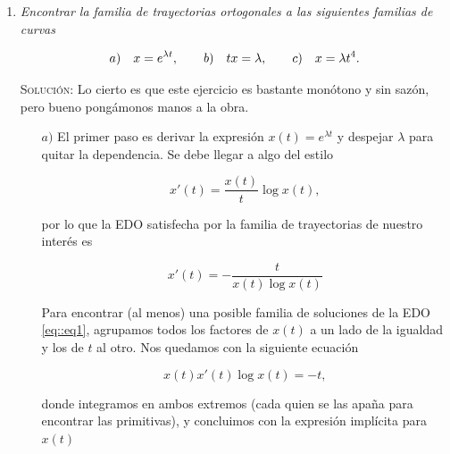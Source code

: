 \documentclass{article}
\begin{document}
\begin{enumerate}
\begin{itemize}
        Con esta sucesión de pasos de inferencia y el resultado del apartado anterior llegamos a la siguiente EDO autónoma, aunque no en forma normal\footnote{Confío en la ausencia de erratas a lo largo del ejercicio, corroborar las cuentas requiere demasiado esfuerzo.}:

        \[x'(t)^2 = 2 \cdot \left[\left(\frac{\sqrt{5}}{2x(t)+1}\right)^2 - 1\right].\]

        $\hfill\square$

        \newpage
    \end{itemize}

    \item \textit{Encontrar la familia de trayectorias ortogonales a las siguientes familias de curvas}

    \[a) \hspace{10px} x = e^{\lambda t}, \hspace{20px} b) \hspace{10px} t x = \lambda, \hspace{20px} c) \hspace{10px} x = \lambda t^4.\]

    \vspace{7px}

    \textsc{Solución:} Lo cierto es que este ejercicio es bastante monótono y sin sazón, pero bueno pongámonos manos a la obra.

    \begin{itemize}
        \item[$a)$] El primer paso es derivar la expresión $x(t) = e^{\lambda t}$ y despejar $\lambda$ para quitar la dependencia. Se debe llegar a algo del estilo
        
        \[x'(t) = \frac{x(t)}{t}\log x(t),\]

        por lo que la EDO satisfecha por la familia de trayectorias de nuestro interés es

        \begin{equation}
            x'(t) = -\frac{t}{x(t) \log x(t)}
            \label{eq::eq1}
        \end{equation}

        Para encontrar (al menos) una posible familia de soluciones de la EDO \eqref{eq::eq1}, agrupamos todos los factores de $x(t)$ a un lado de la igualdad y los de $t$ al otro.
        Nos quedamos con la siguiente ecuación

        \[x(t)x'(t)\log x(t) = -t,\]

        donde integramos en ambos extremos (cada quien se las apaña para encontrar las primitivas), y concluimos con la expresión implícita para $x(t)$


\end{itemize}
\end{enumerate}
\end{document}

